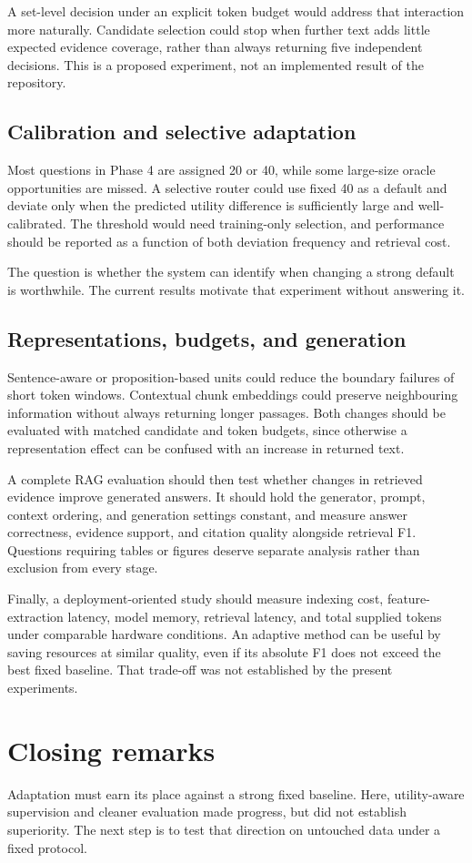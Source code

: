 A set-level decision under an explicit token budget would
address that interaction more naturally. Candidate selection
could stop when further text adds little expected evidence
coverage, rather than always returning five independent
decisions. This is a proposed experiment, not an implemented
result of the repository.

\subsection{Calibration and selective adaptation}
Most questions in Phase 4 are assigned 20 or 40, while some
large-size oracle opportunities are missed. A selective router
could use fixed 40 as a default and deviate only when the
predicted utility difference is sufficiently large and
well-calibrated. The threshold would need training-only
selection, and performance should be reported as a function
of both deviation frequency and retrieval cost.

The question is whether the system can identify when changing
a strong default is worthwhile. The current results motivate
that experiment without answering it.

\subsection{Representations, budgets, and generation}
Sentence-aware or proposition-based units could reduce the
boundary failures of short token windows. Contextual chunk
embeddings could preserve neighbouring information without
always returning longer passages. Both changes should be
evaluated with matched candidate and token budgets, since
otherwise a representation effect can be confused with an
increase in returned text.

A complete RAG evaluation should then test whether changes in
retrieved evidence improve generated answers. It should hold
the generator, prompt, context ordering, and generation
settings constant, and measure answer correctness, evidence
support, and citation quality alongside retrieval F1. Questions
requiring tables or figures deserve separate analysis rather
than exclusion from every stage.

Finally, a deployment-oriented study should measure indexing
cost, feature-extraction latency, model memory, retrieval
latency, and total supplied tokens under comparable hardware
conditions. An adaptive method can be useful by saving
resources at similar quality, even if its absolute F1 does
not exceed the best fixed baseline. That trade-off was not
established by the present experiments.

\section{Closing remarks}
Adaptation must earn its place against a strong fixed baseline.
Here, utility-aware supervision and cleaner evaluation made progress,
but did not establish superiority. The next step is to test that
direction on untouched data under a fixed protocol.
